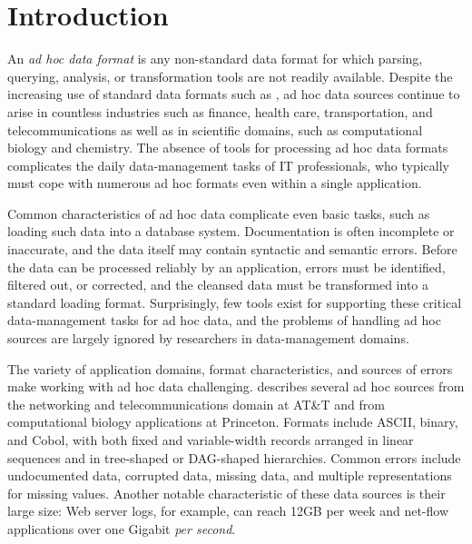 \section{Introduction}
\label{sec:intro}


An {\em ad hoc data format} is any non-standard data format for which
parsing, querying, analysis, or transformation tools are not readily
available.  Despite the increasing use of standard data formats such
as \xml{}, ad hoc data sources continue to arise in countless
industries such as finance, health care, transportation, and
telecommunications as well as in scientific domains, such as
computational biology and chemistry.  The absence of tools for
processing ad hoc data formats complicates the daily data-management
tasks of IT professionals, who typically must cope with numerous ad
hoc formats even within a single application.  

Common characteristics of ad hoc data complicate even basic tasks,
such as loading such data into a database system.  Documentation is
often incomplete or inaccurate, and the data itself may contain
syntactic and semantic errors.  Before the data can be processed
reliably by an application, errors must be identified, filtered out,
or corrected, and the cleansed data must be transformed into a
standard loading format.  Surprisingly, few tools exist for supporting
these critical data-management tasks for ad hoc data, and the problems
of handling ad hoc sources are largely ignored by researchers in
data-management domains.




The variety of application domains, format characteristics, and
sources of errors make working with ad hoc data challenging.
 describes several ad hoc sources from the
networking and telecommunications domain at AT\&T and from
computational biology applications at Princeton.  Formats include
ASCII, binary, and Cobol, with both fixed and variable-width records
arranged in linear sequences and in tree-shaped or DAG-shaped
hierarchies.  Common errors include undocumented data, corrupted data,
missing data, and multiple representations for missing values.
Another notable characteristic of these data sources is their large
size: Web server logs, for example, can reach 12GB per week and net-flow
applications over one Gigabit \emph{per second}.

